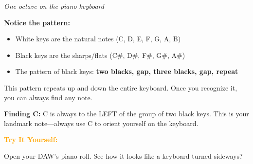 \documentclass[11pt,letterpaper]{article}
\newcommand{\orangetext}[1]{\textcolor{orange}{\textbf{#1}}}
\begin{document}
\begin{center}

\textit{One octave on the piano keyboard}
\end{center}

\textbf{Notice the pattern:}
\begin{itemize}[leftmargin=*]
\item White keys are the natural notes (C, D, E, F, G, A, B)
\item Black keys are the sharps/flats (C\#, D\#, F\#, G\#, A\#)
\item The pattern of black keys: \textbf{two blacks, gap, three blacks, gap, repeat}
\end{itemize}

This pattern repeats up and down the entire keyboard. Once you recognize it, you can always find any note.

\textbf{Finding C:} C is always to the LEFT of the group of two black keys. This is your landmark note—always use C to orient yourself on the keyboard.

\textbf{\orangetext{Try It Yourself:}} 

Open your DAW's piano roll. See how it looks like a keyboard turned sideways? 
\end{document}
